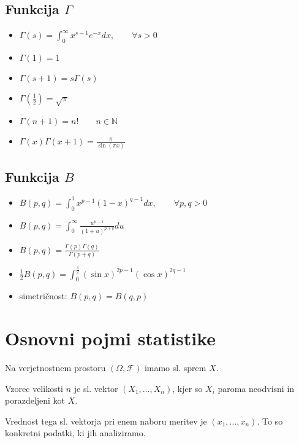 \begin{multicols}{5}
\subsection*{Funkcija $\Gamma$}
\begin{itemize}
    \item $ \Gamma(s) = \int_0^{\infty} x^{s-1} e^{-x} dx, \qquad \forall s > 0 $
    \item $\Gamma(1) = 1$
    \item $\Gamma(s+1) = s \Gamma(s)$
    \item $\Gamma(\frac{1}{2}) = \sqrt{\pi}$
    \item $\Gamma(n+1) = n!\qquad n\in \mathbb{N}$
    \item $\Gamma(x)\Gamma(x+1) = \frac{\pi}{\sin(\pi x)}$
\end{itemize}

\subsection*{Funkcija $B$}
\begin{itemize}
    \item $B(p,q) = \int_0^1 x^{p-1} (1-x)^{q-1} dx, \qquad \forall p,q > 0$
    \item $\displaystyle B(p,q) = \int_0^{\infty} \frac{u^{p-1}}{(1+u)^{p+q}}du $
    \item $\displaystyle B(p,q) = \frac{\Gamma(p) \Gamma(q)}{\Gamma(p+q)}$
    \item $\frac{1}{2} B(p,q) = \displaystyle \int_0^{\frac{\pi}{2}} (\sin x)^{2p-1} (\cos x)^{2q-1}$
    \item simetričnost: $B(p,q) = B(q,p)$
\end{itemize}




\section{Osnovni pojmi statistike}
Na verjetnostnem prostoru $(\Omega, \mathcal{F})$ imamo sl. sprem $X$.

Vzorec velikosti $n$ je sl. vektor $(X_1, \dots, X_n)$, kjer so $X_i$ paroma neodvisni in porazdeljeni kot $X$.

Vrednost tega sl. vektorja pri enem naboru meritev je $(x_1, \dots, x_n)$. To so konkretni podatki, ki jih analiziramo.


\end{multicols}
